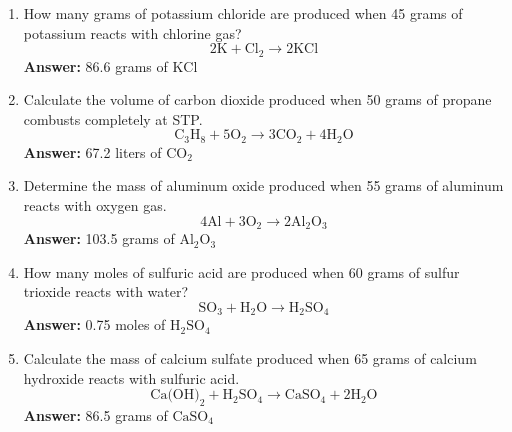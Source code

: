 \documentclass{article}
\begin{document}
\begin{enumerate}
    \item How many grams of potassium chloride are produced when 45 grams of potassium reacts with chlorine gas?
    \[
    2\text{K} + \text{Cl}_2 \rightarrow 2\text{KCl}
    \]
    \textbf{Answer:} 86.6 grams of \(\text{KCl}\)

    \item Calculate the volume of carbon dioxide produced when 50 grams of propane combusts completely at STP.
    \[
    \text{C}_3\text{H}_8 + 5\text{O}_2 \rightarrow 3\text{CO}_2 + 4\text{H}_2\text{O}
    \]
    \textbf{Answer:} 67.2 liters of \(\text{CO}_2\)

    \item Determine the mass of aluminum oxide produced when 55 grams of aluminum reacts with oxygen gas.
    \[
    4\text{Al} + 3\text{O}_2 \rightarrow 2\text{Al}_2\text{O}_3
    \]
    \textbf{Answer:} 103.5 grams of \(\text{Al}_2\text{O}_3\)

    \item How many moles of sulfuric acid are produced when 60 grams of sulfur trioxide reacts with water?
    \[
    \text{SO}_3 + \text{H}_2\text{O} \rightarrow \text{H}_2\text{SO}_4
    \]
    \textbf{Answer:} 0.75 moles of \(\text{H}_2\text{SO}_4\)

    \item Calculate the mass of calcium sulfate produced when 65 grams of calcium hydroxide reacts with sulfuric acid.
    \[
    \text{Ca(OH)}_2 + \text{H}_2\text{SO}_4 \rightarrow \text{CaSO}_4 + 2\text{H}_2\text{O}
    \]
    \textbf{Answer:} 86.5 grams of \(\text{CaSO}_4\)
\end{enumerate}
\end{document}
